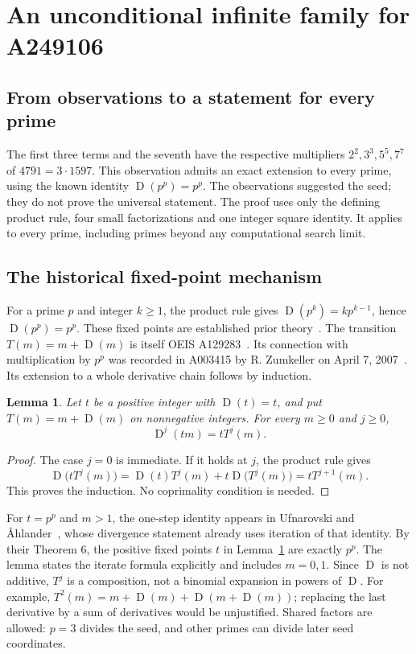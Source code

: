 \documentclass[11pt,a4paper]{article}
\newtheorem{lemma}[theorem]{Lemma}
\theoremstyle{remark}
\newcommand{\D}{\operatorname{D}}
\begin{document}
\section{An unconditional infinite family for A249106}\label{sec:family}
\subsection{From observations to a statement for every prime}
The first three terms and the seventh have the respective multipliers
$2^2,3^3,5^5,7^7$ of $4791=3\cdot1597$. This observation admits an exact
extension to every prime, using the known identity $\D(p^p)=p^p$.
The observations suggested the seed; they do not prove the universal
statement. The proof uses only the defining product rule, four small
factorizations and one integer square identity. It applies to every prime,
including primes beyond any computational search limit.

\subsection{The historical fixed-point mechanism}
For a prime $p$ and integer $k\ge1$, the product rule gives
$\D(p^k)=kp^{k-1}$, hence $\D(p^p)=p^p$.
These fixed points are established prior theory~\cite[Theorem 6]{ufnarovski}.
The transition $T(m)=m+\D(m)$ is itself OEIS A129283~\cite{auxiliary}.
Its connection with multiplication by $p^p$ was recorded in A003415
by R. Zumkeller on April 7, 2007~\cite{derivative}.
Its extension to a whole derivative chain follows by induction.

\begin{lemma}\label{lem:scaling}
Let $t$ be a positive integer with $\D(t)=t$, and put $T(m)=m+\D(m)$
on nonnegative integers. For every $m\ge0$ and $j\ge0$,
\begin{equation}\label{eq:scaling}
 \D^j(tm)=tT^j(m).
\end{equation}
\end{lemma}
\begin{proof}
The case $j=0$ is immediate. If it holds at $j$, the product rule gives
\[
\D\bigl(tT^j(m)\bigr)=\D(t)T^j(m)+t\D\bigl(T^j(m)\bigr)
=tT^{j+1}(m).
\]
This proves the induction. No coprimality condition is needed.
\end{proof}
For $t=p^p$ and $m>1$, the one-step identity appears in
Ufnarovski and \AA hlander~\cite[Theorem 4]{ufnarovski}, whose divergence
statement already uses iteration of that identity. By their Theorem 6,
the positive fixed points $t$ in Lemma~\ref{lem:scaling} are exactly $p^p$.
The lemma states the iterate formula explicitly and includes $m=0,1$.
Since $\D$ is not additive, $T^j$ is a composition,
not a binomial expansion in powers of $\D$.
For example,
$T^2(m)=m+\D(m)+\D(m+\D(m))$; replacing the last derivative by a sum
of derivatives would be unjustified. Shared factors are allowed:
$p=3$ divides the seed, and other primes can divide later seed coordinates.
\end{document}
